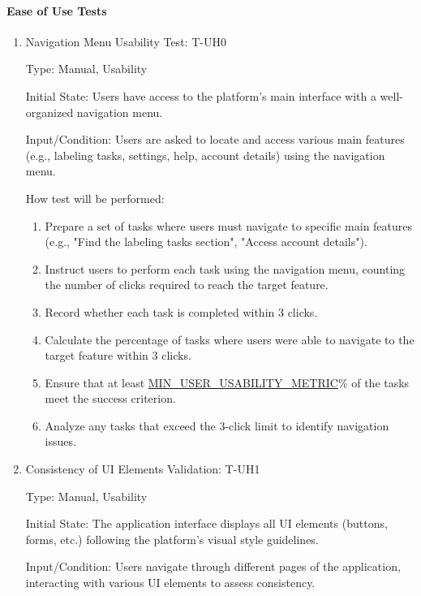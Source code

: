 \documentclass[12pt, titlepage]{article}
\begin{document}
\paragraph{Ease of Use Tests}
\begin{enumerate}

\item{Navigation Menu Usability Test: T-UH0\\}

Type: Manual, Usability

Initial State: Users have access to the platform's main interface with a well-organized navigation menu.

Input/Condition: Users are asked to locate and access various main features (e.g., labeling tasks, settings, help, account details) using the navigation menu.

How test will be performed:
\begin{enumerate}
    \item Prepare a set of tasks where users must navigate to specific main features (e.g., "Find the labeling tasks section", "Access account details").
    \item Instruct users to perform each task using the navigation menu, counting the number of clicks required to reach the target feature.
    \item Record whether each task is completed within 3 clicks.
    \item Calculate the percentage of tasks where users were able to navigate to the target feature within 3 clicks.
    \item Ensure that at least \hyperref[MIN_USER_USABILITY_METRIC]{MIN\_USER\_USABILITY\_METRIC}\% of the tasks meet the success criterion.
    \item Analyze any tasks that exceed the 3-click limit to identify navigation issues.
\end{enumerate}

\item{Consistency of UI Elements Validation: T-UH1\\}

Type: Manual, Usability

Initial State: The application interface displays all UI elements (buttons, forms, etc.) following the platform’s visual style guidelines.

Input/Condition: Users navigate through different pages of the application, interacting with various UI elements to assess consistency.


\end{enumerate}
\end{document}
